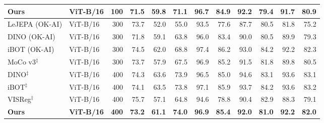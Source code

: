 \begin{table}[htbp]
{\begin{tabular}{llrrrrrrrrrr}
\textbf{Ours} & \textbf{ViT-B/16} & \textbf{100} & \textbf{71.5} & \textbf{59.8} & \textbf{71.1} & \textbf{96.7} & \textbf{84.9} & \textbf{92.2} & \textbf{79.4} & \textbf{91.7} & \textbf{80.9} \\
\midrule
LeJEPA (OK-AI) & ViT-B/16 & 300 & 73.7 & 52.0 & 55.0 & 93.5 & 77.6 & 87.7 & 80.5 & 81.8 & 75.2 \\
DINO (OK-AI) & ViT-B/16 & 300 & 71.8 & 59.1 & 63.8 & 96.0 & 83.4 & 90.0 & 80.5 & 89.9 & 79.3 \\
iBOT (OK-AI) & ViT-B/16 & 300 & 74.5 & 62.0 & 68.8 & 97.4 & 86.2 & 93.0 & 84.2 & 92.2 & 82.3 \\
MoCo v3$^\ddag$ & ViT-B/16 & 300 & 73.7 & 57.9 & 67.5 & 96.9 & 85.2 & 91.5 & 81.8 & 89.8 & 80.5 \\
DINO$^\ddag$ & ViT-B/16 & 400 & 74.3 & 63.6 & 73.9 & 96.5 & 85.0 & 94.6 & 83.1 & 93.6 & 83.1 \\
iBOT$^\ddag$ & ViT-B/16 & 400 & 74.1 & 63.5 & 73.8 & 97.1 & 85.9 & 93.7 & 84.2 & 93.6 & 83.2 \\
VISReg$^\ddag$ & ViT-B/16 & 400 & 75.7 & 57.1 & 64.8 & 94.6 & 78.8 & 90.4 & 82.9 & 88.3 & 79.1 \\
\textbf{Ours} & \textbf{ViT-B/16} & \textbf{400} & \textbf{73.2} & \textbf{61.1} & \textbf{74.0} & \textbf{96.9} & \textbf{85.4} & \textbf{92.0} & \textbf{81.0} & \textbf{92.2} & \textbf{82.0} \\
\bottomrule
\end{tabular}%
}
\end{table}
